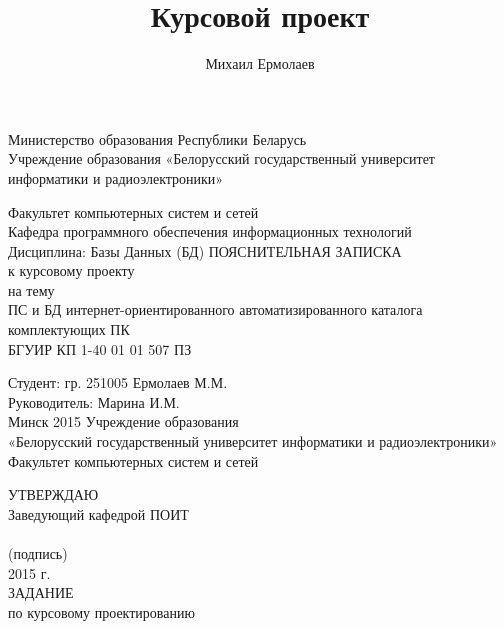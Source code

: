 \documentclass[14pt,a4paper]{extreport}
\title{Курсовой проект}
\author{Михаил Ермолаев}
\begin{document}
	\center
	Министерство образования Республики Беларусь\\
	Учреждение образования «Белорусский государственный университет информатики и радиоэлектроники»
	\vspace*{2cm}
	\endcenter
	\raggedright
	Факультет компьютерных систем и сетей\\
	\medskip
	Кафедра программного обеспечения информационных технологий\\
	\medskip
	Дисциплина:  Базы Данных (БД)
	\vspace*{2cm}
	\center
	ПОЯСНИТЕЛЬНАЯ ЗАПИСКА\\
	к курсовому проекту\\
	на тему\\
	\medskip
	ПС и БД  интернет-ориентированного автоматизированного каталога комплектующих ПК \\
    \medskip
    БГУИР КП 1-40 01 01 507 ПЗ
	\vspace*{4cm}
	\endcenter
	\raggedright
	\hspace*{7.94cm}Студент:  гр. 251005 Ермолаев М.М.\\
	\bigskip
	\hspace*{7.94cm}Руководитель:  Марина И.М.\\
	\center
	\vspace*{7cm}
	Минск 2015
	\pagestyle{empty}
	\newpage
	\center
	Учреждение образования\\
	\medskip
	«Белорусский государственный университет информатики и радиоэлектроники»\\
	\medskip
	Факультет компьютерных систем и сетей\\
	\medskip
	\endcenter
	\raggedright
	\hspace*{9.53cm}УТВЕРЖДАЮ\\
	\hspace*{9.53cm}Заведующий кафедрой ПОИТ\\
	\hspace*{9.53cm}\underline{\hspace{6cm}} \\
	\hspace*{11cm}\small (подпись) \normalsize\\
	\hspace*{9.53cm}\underline{\hspace{5cm}}2015 г.\\
	\medskip
	\center
	ЗАДАНИЕ\\
	по курсовому проектированию\\
\end{document}
